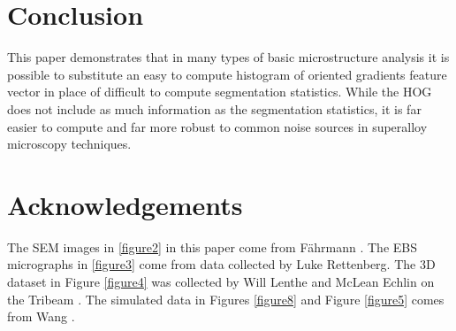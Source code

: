 \documentclass[review]{elsarticle}
\begin{document}
	\section{Conclusion}
	
	This paper demonstrates that in many types of basic microstructure analysis it is possible to substitute an easy to compute histogram of oriented gradients feature vector in place of difficult to compute segmentation statistics. While the HOG does not include as much information as the segmentation statistics, it is far easier to compute and far more robust to common noise sources in superalloy microscopy techniques.
	
	\section{Acknowledgements}
	
	The SEM images in \ref{figure2} in this paper come from F\"ahrmann \cite{faehrmann}. The EBS micrographs in \ref{figure3} come from data collected by Luke Rettenberg. The 3D dataset in Figure \ref{figure4} was collected by Will Lenthe and McLean Echlin on the Tribeam \cite{tribeam}. The simulated data in Figures \ref{figure8} and Figure \ref{figure5} comes from Wang \cite{ywang2}.

	
\end{document}

